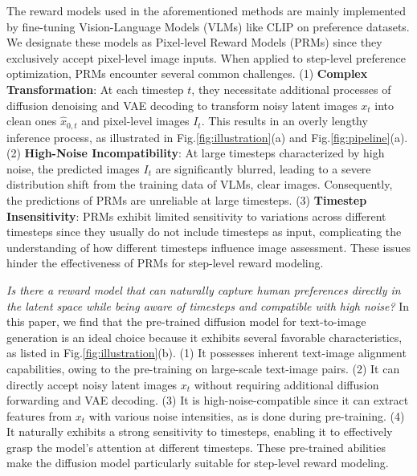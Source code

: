The reward models used in the aforementioned methods are mainly implemented by fine-tuning Vision-Language Models (VLMs) like CLIP \cite{clip} on preference datasets. We designate these models as Pixel-level Reward Models (PRMs) since they exclusively accept pixel-level image inputs. When applied to step-level preference optimization, PRMs encounter several common challenges. (1) \textbf{Complex Transformation}: At each timestep $t$, they necessitate additional processes of diffusion denoising and VAE \cite{vae} decoding to transform noisy latent images $x_t$ into clean ones $\hat{x}_{0,t}$ and pixel-level images $I_t$. This results in an overly lengthy inference process, as illustrated in Fig.\;\ref{fig:illustration}\;(a) and Fig.\;\ref{fig:pipeline}\;(a). (2) \textbf{High-Noise Incompatibility}: At large timesteps characterized by high noise, the predicted images $I_t$ are significantly blurred, leading to a severe distribution shift from the training data of VLMs, \ie clear images. Consequently, the predictions of PRMs are unreliable at large timesteps. (3) \textbf{Timestep Insensitivity}: PRMs exhibit limited sensitivity to variations across different timesteps since they usually do not include timesteps as input, complicating the understanding of how different timesteps influence image assessment. These issues hinder the effectiveness of PRMs for step-level reward modeling.

\textit{Is there a reward model that can naturally capture human preferences directly in the latent space while being aware of timesteps and compatible with high noise?}
In this paper, we find that the pre-trained diffusion model for text-to-image generation is an ideal choice because it exhibits several favorable characteristics, as listed in Fig.\;\ref{fig:illustration}\;(b). (1) It possesses inherent text-image alignment capabilities, owing to the pre-training on large-scale text-image pairs. (2) It can directly accept noisy latent images $x_t$ without requiring additional diffusion forwarding and VAE decoding. (3) It is high-noise-compatible since it can extract features from $x_t$ with various noise intensities, as is done during pre-training. (4) It naturally exhibits a strong sensitivity to timesteps, enabling it to effectively grasp the model's attention at different timesteps. These pre-trained abilities make the diffusion model particularly suitable for step-level reward modeling.

